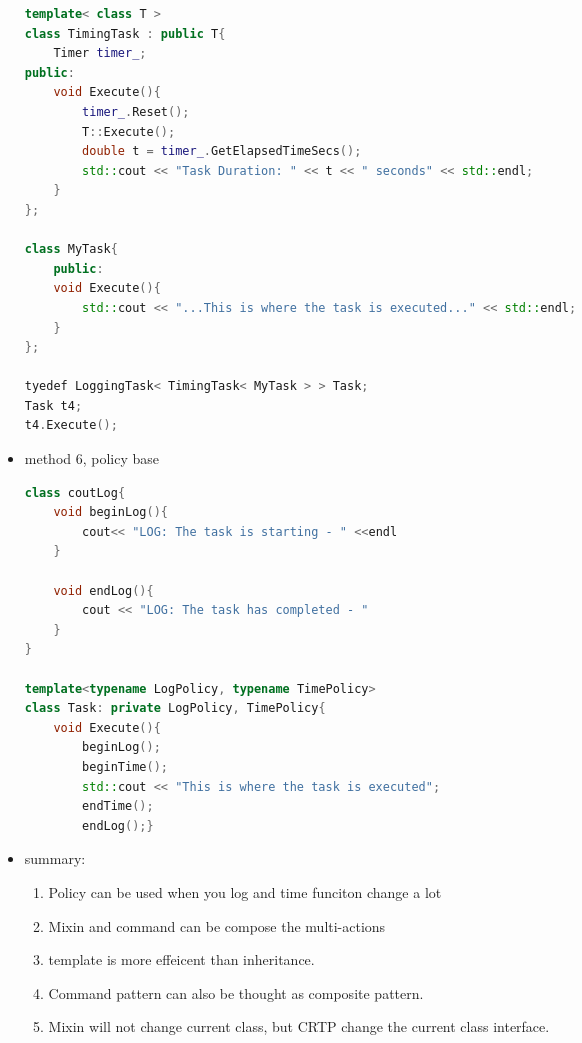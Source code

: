 \documentclass[a4paper,11pt,twoside]{book}
\begin{document}
\begin{itemize}
\begin{lstlisting}[frame=single, language=c++]
template< class T >
class TimingTask : public T{
	Timer timer_;
public:
	void Execute(){
		timer_.Reset();
		T::Execute();
		double t = timer_.GetElapsedTimeSecs();
		std::cout << "Task Duration: " << t << " seconds" << std::endl;
	}
};
	
class MyTask{
	public:
	void Execute(){
		std::cout << "...This is where the task is executed..." << std::endl;
	}
};
	
tyedef LoggingTask< TimingTask< MyTask > > Task;
Task t4;
t4.Execute();
\end{lstlisting}

		\item method 6, policy base
\begin{lstlisting}[frame=single, language=c++]
class coutLog{
	void beginLog(){
		cout<< "LOG: The task is starting - " <<endl
	}
	
	void endLog(){
		cout << "LOG: The task has completed - "
	}
}
	
template<typename LogPolicy, typename TimePolicy>
class Task: private LogPolicy, TimePolicy{
	void Execute(){
		beginLog();
		beginTime();
		std::cout << "This is where the task is executed";
		endTime();
		endLog();}
\end{lstlisting}
	
	\item summary:
	\begin{enumerate}
		\item Policy can be used when you log and time funciton change a lot
		\item Mixin and command can be compose the multi-actions
		\item template is more effeicent than inheritance. 
		\item Command pattern can also be thought as composite pattern.
		\item Mixin will not change current class, but CRTP change the current class interface.
	\end{enumerate}
	
\end{itemize}
\end{document}

